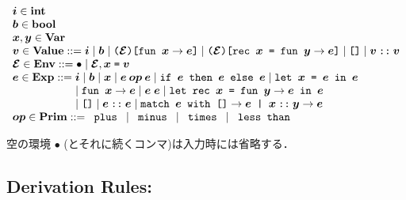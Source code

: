 \documentclass[11pt]{jarticle}
\begin{document}
\[\begin{array}{l}
\EvalMLivMV{i}[] \in \mathbf{int}\\
\EvalMLivMV{b}[] \in \mathbf{bool}\\
\EvalMLivMV{x}[], \EvalMLivMV{y}[] \in \mathbf{Var}\\
\EvalMLivMV{v}[] \in \mathbf{Value} ::= \EvalMLivMV{i}[]
\mid \EvalMLivMV{b}[] \mid \EvalMLivFunTerm{\EvalMLivMV{env}[]}
{\EvalMLivMV{x}[]}{\EvalMLivMV{e}[]}
\mid \EvalMLivRecTerm{\EvalMLivMV{env}[]}{\EvalMLivMV{x}[]}{\EvalMLivMV{y}[]}
{\EvalMLivMV{e}[]} \mid \EvalMLivNilVTerm
\mid \EvalMLivConsVTerm{\EvalMLivMV{v}[]}
{\EvalMLivMV{v}[]}\\
\EvalMLivMV{env}[] \in \mathbf{Env} ::= \EvalMLivEmptyTerm
\mid \EvalMLivBindTerm{\EvalMLivMV{env}[]}{\EvalMLivMV{x}[]}
{\EvalMLivMV{v}[]}\\
\EvalMLivMV{e}[] \in \mathbf{Exp} ::= \EvalMLivMV{i}[] \mid \EvalMLivMV{b}[]
\mid \EvalMLivMV{x}[] \mid \EvalMLivBinOpTerm{\EvalMLivMV{op}[]}
{\EvalMLivMV{e}[]}{\EvalMLivMV{e}[]} \mid \EvalMLivIfTerm{\EvalMLivMV{e}[]}
{\EvalMLivMV{e}[]}{\EvalMLivMV{e}[]} \mid \EvalMLivLetTerm{\EvalMLivMV{x}[]}
{\EvalMLivMV{e}[]}{\EvalMLivMV{e}[]}  \\ \hspace*{2.0cm}
\mid \EvalMLivAbsTerm{\EvalMLivMV{x}[]}
{\EvalMLivMV{e}[]} \mid \EvalMLivAppTerm{\EvalMLivMV{e}[]}{\EvalMLivMV{e}[]}
\mid \EvalMLivLetRecTerm{\EvalMLivMV{x}[]}{\EvalMLivMV{y}[]}
{\EvalMLivMV{e}[]}{\EvalMLivMV{e}[]}  \\ \hspace*{2.0cm}
\mid \EvalMLivNilTerm
\mid \EvalMLivConsTerm{\EvalMLivMV{e}[]}{\EvalMLivMV{e}[]}
\mid \EvalMLivMatchTerm{\EvalMLivMV{e}[]}{\EvalMLivMV{e}[]}{\EvalMLivMV{x}[]}
{\EvalMLivMV{y}[]}{\EvalMLivMV{e}[]}\\
\EvalMLivMV{op}[] \in \mathbf{Prim} ::= \EvalMLivPlusTerm
\mid \EvalMLivMinusTerm \mid \EvalMLivMultTerm
\mid \EvalMLivLtTerm\\
\end{array}\]

空の環境 \(\bullet\) (とそれに続くコンマ)は入力時には省略する．

\subsection*{Derivation Rules:}
\end{document}
